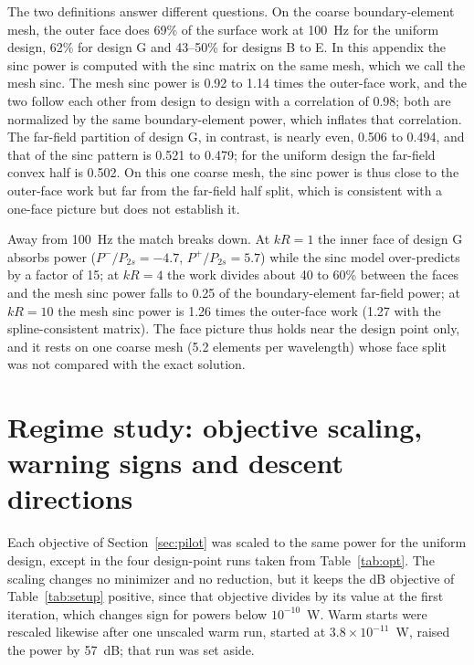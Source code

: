 \documentclass[preprint,12pt]{elsarticle}
\begin{document}
The two definitions answer different questions. On the coarse boundary-element mesh, the outer face does 69\% of the surface work at 100~Hz for the uniform design, 62\% for design G and 43--50\% for designs B to E. %
In this appendix the sinc power is computed with the sinc matrix on the same mesh, which we call the mesh sinc. The mesh sinc power is 0.92 to 1.14 times the outer-face work, and the two follow each other from design to design with a correlation of 0.98; both are normalized by the same boundary-element power, which inflates that correlation. %
The far-field partition of design G, in contrast, is nearly even, 0.506 to 0.494, and that of the sinc pattern is 0.521 to 0.479; for the uniform design the far-field convex half is 0.502. %
On this one coarse mesh, the sinc power is thus close to the outer-face work but far from the far-field half split, which is consistent with a one-face picture but does not establish it.

Away from 100~Hz the match breaks down. At $kR=1$ the inner face of design G absorbs power ($P^-/P_{2s}=-4.7$, $P^+/P_{2s}=5.7$) while the sinc model over-predicts by a factor of 15; at $kR=4$ the work divides about 40 to 60\% between the faces and the mesh sinc power falls to 0.25 of the boundary-element far-field power; at $kR=10$ the mesh sinc power is 1.26 times the outer-face work (1.27 with the spline-consistent matrix). %
The face picture thus holds near the design point only, and it rests on one coarse mesh (5.2 elements per wavelength) whose face split was not compared with the exact solution.

\section{Regime study: objective scaling, warning signs and descent directions}
\label{app:pilotdetails}
Each objective of Section~\ref{sec:pilot} was scaled to the same power for the uniform design, except in the four design-point runs taken from Table~\ref{tab:opt}. The scaling changes no minimizer and no reduction, but it keeps the dB objective of Table~\ref{tab:setup} positive, since that objective divides by its value at the first iteration, which changes sign for powers below $10^{-10}$~W. Warm starts were rescaled likewise after one unscaled warm run, started at $3.8\times10^{-11}$~W, raised the power by 57~dB; that run was set aside. %
\end{document}
